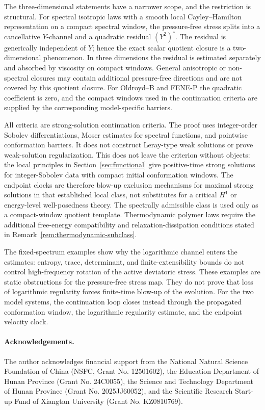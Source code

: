 \documentclass[11pt]{article}
\begin{document}
The three-dimensional statements have a narrower scope, and the restriction is
structural.  For spectral isotropic laws with a smooth local Cayley--Hamilton
representation on a compact spectral window, the pressure-free stress splits
into a cancellative \(Y\)-channel and a quadratic residual \((Y^2)^\circ\).  The
residual is generically independent of \(Y\); hence the exact scalar quotient
closure is a two-dimensional phenomenon.  In three dimensions the residual is
estimated separately and absorbed by viscosity on compact windows.  General
anisotropic or non-spectral closures may contain additional pressure-free
directions and are not covered by this quotient closure.  For Oldroyd--B and
FENE-P the quadratic coefficient is zero, and the compact windows used in the
continuation criteria are supplied by the corresponding model-specific barriers.

All criteria are strong-solution continuation criteria.  The proof uses
integer-order Sobolev differentiations, Moser estimates for spectral functions,
and pointwise conformation barriers.  It does not construct Leray-type weak
solutions or prove weak-solution regularization.  This does not leave the
criterion without objects: the local principles in Section~\ref{sec:functional}
give positive-time strong solutions for integer-Sobolev data with compact
initial conformation windows.  The endpoint clocks are therefore blow-up
exclusion mechanisms for maximal strong solutions in that established local
class, not substitutes for a critical \(H^1\) or energy-level well-posedness
theory.  The spectrally admissible class is used only as a compact-window
quotient template.  Thermodynamic polymer laws require the additional
free-energy compatibility and relaxation-dissipation conditions stated in
Remark~\ref{rem:thermodynamic-subclass}.

The fixed-spectrum examples show why the logarithmic channel enters the
estimates: entropy, trace, determinant, and finite-extensibility bounds do not
control high-frequency rotation of the active deviatoric stress.  These examples
are static obstructions for the pressure-free stress map.  They do not prove
that loss of logarithmic regularity forces finite-time blow-up of the evolution.
For the two model systems, the continuation loop closes instead through the
propagated conformation window, the logarithmic regularity estimate, and the
endpoint velocity clock.

\paragraph{Acknowledgements.}
The author acknowledges financial support from the National Natural Science
Foundation of China (NSFC, Grant No. 12501602), the Education Department of
Hunan Province (Grant No. 24C0055), the Science and Technology Department of
Hunan Province (Grant No. 2025JJ60052), and the Scientific Research Start-up
Fund of Xiangtan University (Grant No. KZ0810769).
\end{document}
